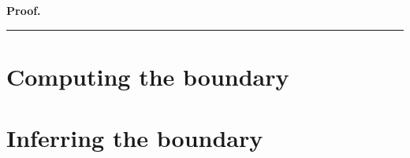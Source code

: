 \documentclass{tufte-handout}
\newenvironment{pf}[1][Proof]{\textbf{#1.} }{\ \rule{0.5em}{0.5em}}
\begin{document}
\begin{pf}
%			
	\end{pf}
	
	
	\section{Computing the boundary}
	
	\section{Inferring the boundary}
	
\end{document}
